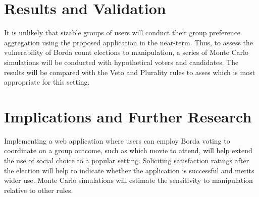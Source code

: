 \documentclass{article}
\begin{document}


\section{Results and Validation}


It is unlikely that sizable groups of users will conduct their group preference aggregation using the proposed application in the near-term. Thus, to assess the vulnerability of Borda count elections to manipulation, a series of Monte Carlo simulations will be conducted with hypothetical voters and candidates. The results will be compared with the Veto and Plurality rules to asses which is most appropriate for this setting.

\section{Implications and Further Research}

Implementing a web application where users can employ Borda voting to coordinate on a group outcome, such as which movie to attend, will help extend the use of social choice to a popular setting. Soliciting satisfaction ratings after the election will help to indicate whether the application is successful and merits wider use. Monte Carlo simulations will estimate the sensitivity to manipulation relative to other rules. 

\vspace{-0.3in}

\begingroup
\renewcommand{\section}[2]{}

\

\endgroup
\end{document}
